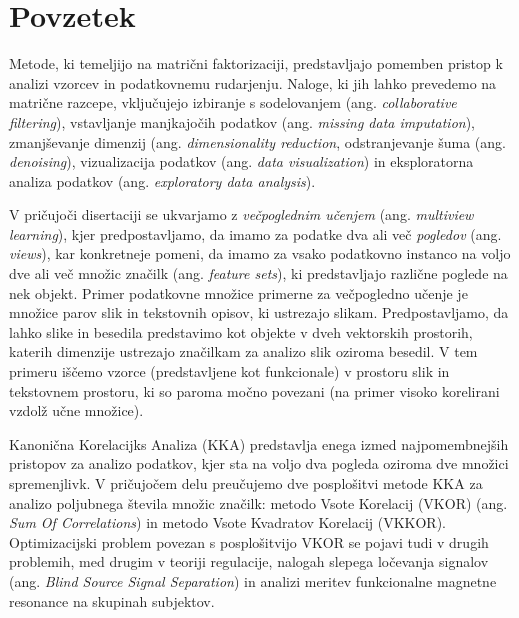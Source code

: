 %
\chapter*{Povzetek}

Metode, ki temeljijo na matrični faktorizaciji, predstavljajo pomemben pristop k analizi vzorcev
in podatkovnemu rudarjenju. Naloge, ki jih lahko prevedemo na matrične razcepe, vključujejo izbiranje
s sodelovanjem (ang. \emph{collaborative filtering}), vstavljanje manjkajočih podatkov (ang. \emph{missing data imputation}),
zmanjševanje dimenzij (ang. \emph{dimensionality reduction}, odstranjevanje šuma (ang. \emph{denoising}), vizualizacija
podatkov (ang. \emph{data visualization}) in eksploratorna analiza podatkov (ang. \emph{exploratory data analysis}).

V pričujoči disertaciji se ukvarjamo z \emph{večpoglednim učenjem} (ang. \emph{multiview learning}), kjer
predpostavljamo, da imamo za podatke dva ali več \emph{pogledov} (ang. \emph{views}), kar konkretneje
pomeni, da imamo za vsako podatkovno instanco na voljo dve ali več množic značilk (ang. \emph{feature sets}),
ki predstavljajo različne poglede na nek objekt. Primer podatkovne množice primerne za večpogledno učenje
je množice parov slik in tekstovnih opisov, ki ustrezajo slikam. Predpostavljamo, da lahko slike in besedila
predstavimo kot objekte v dveh vektorskih prostorih, katerih dimenzije ustrezajo značilkam za analizo
slik oziroma besedil. V tem primeru iščemo vzorce (predstavljene kot funkcionale) v prostoru slik
in tekstovnem prostoru, ki so paroma močno povezani (na primer visoko korelirani vzdolž učne množice).

Kanonična Korelacijks Analiza (KKA) predstavlja enega izmed najpomembnejših pristopov za analizo
podatkov, kjer sta na voljo dva pogleda oziroma dve množici spremenjlivk. V pričujočem delu
preučujemo dve posplošitvi metode KKA za analizo poljubnega števila množic značilk: metodo
Vsote Korelacij (VKOR) (ang. \emph{Sum Of Correlations}) in metodo Vsote Kvadratov Korelacij (VKKOR).
Optimizacijski problem povezan s posplošitvijo VKOR se pojavi tudi v drugih problemih, med drugim
v teoriji regulacije, nalogah slepega ločevanja signalov (ang. \emph{Blind Source Signal Separation})
in analizi meritev funkcionalne magnetne resonance na skupinah subjektov.

